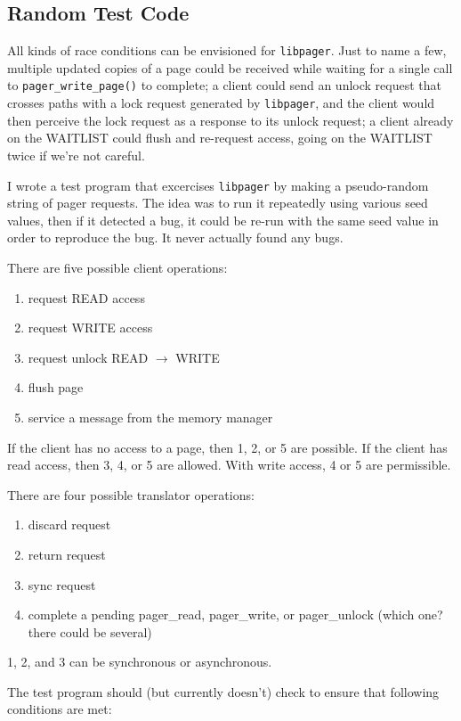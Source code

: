 \documentclass{article}
\def\libpager{{\tt libpager}\xspace}
\def\pagerwritepage{{\tt pager_write_page()}\xspace}
\begin{document}
\subsection{Random Test Code}

All kinds of race conditions can be envisioned for \libpager.  Just to
name a few, multiple updated copies of a page could be received while
waiting for a single call to \pagerwritepage to complete; a client
could send an unlock request that crosses paths with a lock request
generated by \libpager, and the client would then perceive the lock
request as a response to its unlock request; a client already on the
WAITLIST could flush and re-request access, going on the WAITLIST
twice if we're not careful.

I wrote a test program that excercises \libpager by making a
pseudo-random string of pager requests.  The idea was to run it
repeatedly using various seed values, then if it detected a bug, it
could be re-run with the same seed value in order to reproduce the
bug.  It never actually found any bugs.

There are five possible client operations:

\begin{enumerate}
\item request READ access
\item request WRITE access
\item request unlock READ $\to$ WRITE
\item flush page
\item service a message from the memory manager
\end{enumerate}

If the client has no access to a page, then 1, 2, or 5 are possible.
If the client has read access, then 3, 4, or 5 are allowed.  With
write access, 4 or 5 are permissible.

There are four possible translator operations:

\begin{enumerate}
\item discard request
\item return request
\item sync request
\item complete a pending pager_read, pager_write, or pager_unlock (which one? there could be several)
\end{enumerate}

1, 2, and 3 can be synchronous or asynchronous.

The test program should (but currently doesn't) check to ensure that
following conditions are met:
\end{document}
